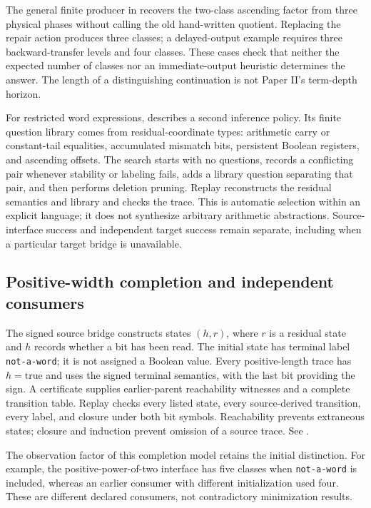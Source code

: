 The general finite producer in  recovers the two-class ascending factor from three physical phases without calling the old hand-written quotient. Replacing the repair action produces three classes; a delayed-output example requires three backward-transfer levels and four classes. These cases check that neither the expected number of classes nor an immediate-output heuristic determines the answer. The length of a distinguishing continuation is not Paper II's term-depth horizon.

For restricted word expressions,  describes a second inference policy. Its finite question library comes from residual-coordinate types: arithmetic carry or constant-tail equalities, accumulated mismatch bits, persistent Boolean registers, and ascending offsets. The search starts with no questions, records a conflicting pair whenever stability or labeling fails, adds a library question separating that pair, and then performs deletion pruning. Replay reconstructs the residual semantics and library and checks the trace. This is automatic selection within an explicit language; it does not synthesize arbitrary arithmetic abstractions. Source-interface success and independent target success remain separate, including when a particular target bridge is unavailable.

\subsection{Positive-width completion and independent consumers}
The signed source bridge constructs states $(h,r)$, where $r$ is a residual state and $h$ records whether a bit has been read. The initial state has terminal label \texttt{not-a-word}; it is not assigned a Boolean value. Every positive-length trace has $h=\mathrm{true}$ and uses the signed terminal semantics, with the last bit providing the sign. A certificate supplies earlier-parent reachability witnesses and a complete transition table. Replay checks every listed state, every source-derived transition, every label, and closure under both bit symbols. Reachability prevents extraneous states; closure and induction prevent omission of a source trace. See .

The observation factor of this completion model retains the initial distinction. For example, the positive-power-of-two interface has five classes when \texttt{not-a-word} is included, whereas an earlier consumer with different initialization used four. These are different declared consumers, not contradictory minimization results.

